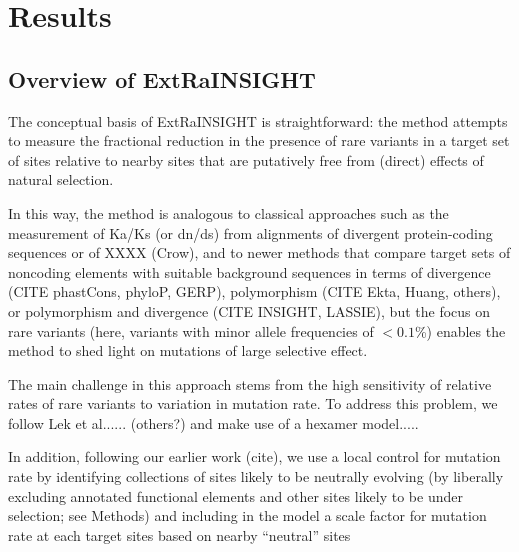 \documentclass[11pt]{article}
\begin{document}

\section*{Results}

\subsection*{Overview of ExtRaINSIGHT}

The conceptual basis of ExtRaINSIGHT is straightforward: the method attempts to measure the fractional reduction in the presence of rare variants in a target set of sites relative to nearby sites that are putatively free from (direct) effects of natural selection.  

In this way, the method is analogous to classical approaches such as the measurement of Ka/Ks (or dn/ds) from alignments of divergent protein-coding sequences or of XXXX (Crow),
and to newer methods that compare target sets of noncoding elements with suitable background sequences in terms of divergence (CITE phastCons, phyloP, GERP), polymorphism (CITE Ekta, Huang, others), or polymorphism and divergence (CITE INSIGHT, LASSIE),
but the focus on rare variants (here, variants with minor allele frequencies of $< 0.1$\%) enables the method to shed light on mutations of large selective effect.

The main challenge in this approach stems from the high sensitivity of relative rates of rare variants to variation in mutation rate.  To address this problem, we follow Lek et al...... (others?)
and make use of a 
hexamer model.....

In addition, following our earlier work (cite), we use a local control for mutation rate
by identifying collections of sites likely to be neutrally evolving (by liberally excluding annotated functional elements and other sites likely to be under selection; see Methods)
and including in the model a scale factor for mutation rate at each target sites based on nearby ``neutral'' sites
\end{document}
